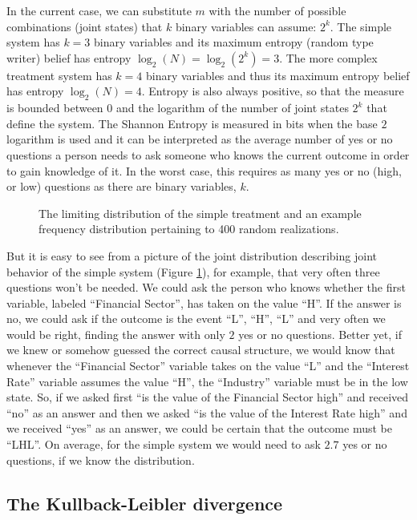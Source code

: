In the current case, we can substitute $m$ with the number of possible combinations (joint states) that $k$ binary variables can assume: $2^k$.
The simple system has $k=3$ binary variables and its maximum entropy (random type writer) belief has entropy $\log_2(N)=\log_2(2^k) = 3$. The more complex treatment system has $k=4$ binary variables and thus its maximum entropy belief has entropy $\log_2(N) = 4$. Entropy is also always positive, so that the measure is bounded between $0$ and the logarithm of the number of joint states $2^k$ that define the system. The Shannon Entropy is measured in bits when the base $2$ logarithm is used and it can be interpreted as the average number of yes or no questions a person needs to ask someone who knows the current outcome in order to gain knowledge of it.  In the worst case, this requires as many yes or no (high, or low) questions as there are binary variables, $k$. 

\begin{figure}
\noindent{}
\caption{The limiting distribution of the simple treatment and an example frequency distribution pertaining to 400 random realizations.}
\label{fig:simplejoint} 
\end{figure}

But it is easy to see from a picture of the joint distribution describing joint behavior of the simple system (Figure \ref{fig:simplejoint}), for example, that very often three questions won't be needed. We could ask the person who knows whether the first variable, labeled ``Financial Sector'', has taken on the value ``H''.  If the answer is no, we could ask if the outcome is the event ``L'', ``H'', ``L'' and very often we would be right, finding the answer with only $2$ yes or no questions. Better yet, if we knew or somehow guessed the correct causal structure, we would know that whenever the ``Financial Sector'' variable takes on the value ``L'' and the ``Interest Rate'' variable assumes the value ``H'', the ``Industry'' variable must be in the low state. So, if we asked first ``is the value of the Financial Sector high'' and received ``no'' as an answer and then we asked ``is the value of the Interest Rate high'' and we received ``yes'' as an answer, we could be certain that the outcome must be ``LHL''. On average, for the simple system we would need to ask $2.7$ yes or no questions, if we know the distribution.   

\subsection{The Kullback-Leibler divergence}

